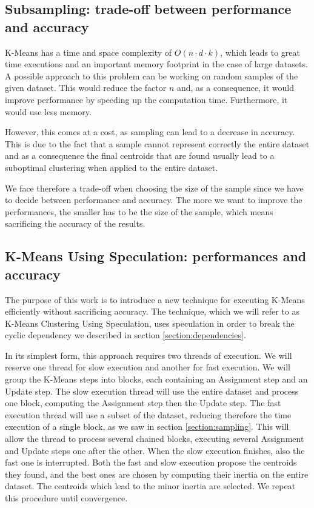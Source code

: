 \label{section:dependencies}

\subsection{Subsampling: trade-off between performance and accuracy}

K-Means has a time and space complexity of $O(n\cdot d\cdot k)$, which leads to great time executions and an important memory footprint in the case of large datasets. 
A possible approach to this problem can be working on random samples of the given dataset. This would reduce the factor $n$ and, as a consequence, it would improve performance by speeding up the computation time. Furthermore, it would use less memory. 

However, this comes at a cost, as sampling can lead to a decrease in accuracy. This is due to the fact that a sample cannot represent correctly the entire dataset and as a consequence the final centroids that are found usually lead to a suboptimal clustering when applied to the entire dataset.

We face therefore a trade-off when choosing the size of the sample since we have to decide between performance and accuracy. The more we want to improve the performances, the smaller has to be the size of the sample, which means sacrificing the accuracy of the results.
\label{section:sampling}

\subsection{K-Means Using Speculation: performances and accuracy}

The purpose of this work is to introduce a new technique for executing K-Means efficiently without sacrificing accuracy. The technique, which we will refer to as K-Means Clustering Using Speculation, uses speculation in order to break the cyclic dependency we described in section \ref{section:dependencies}.

In its simplest form, this approach requires two threads of execution. We will reserve one thread for slow execution and another for fast execution. We will group the K-Means steps into blocks, each containing an Assignment step and an Update step. The slow execution thread will use the entire dataset and process one block, computing the Assignment step then the Update step. The fast execution thread will use a subset of the dataset, reducing therefore the time execution of a single block, as we saw in section \ref{section:sampling}. This will allow the thread to process several chained blocks, executing several Assignment and Update steps one after the other.
When the slow execution finishes, also the fast one is interrupted.
Both the fast and slow execution propose the centroids they found, and the best ones are chosen by computing their inertia on the entire dataset. The centroids which lead to the minor inertia are selected.
We repeat this procedure until convergence.

